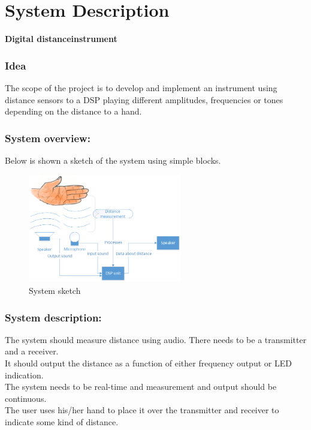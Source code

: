 \chapter{System Description}
\begin{center}
\textbf{\HUGE Digital distanceinstrument}\\
\end{center}
\subsection{Idea}
The scope of the project is to develop and implement an instrument using distance sensors to a DSP playing different amplitudes, frequencies or tones depending on the distance to a hand.
\subsection{System overview:}
Below is shown a sketch of the system using simple blocks.
\begin{figure}[H]
\centering
\includegraphics[width=0.6\textwidth]{billeder/systemoverview}
\caption{System sketch}
\label{fig:systemoverview}
\end{figure}

\subsection{System description:}
The system should measure distance using audio. There needs to be a transmitter and a receiver.\\
It should output the distance as a function of either frequency output or LED indication.\\
The system needs to be real-time and measurement and output should be continuous.\\
The user uses his/her hand to place it over the transmitter and receiver to indicate some kind of distance.\\


